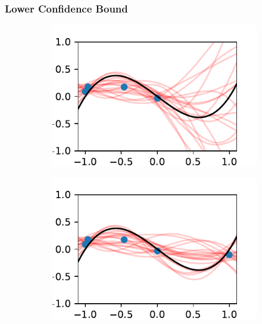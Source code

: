 \documentclass{beamer}
\begin{document}
\begin{frame}
    \frametitle{Lower Confidence Bound}
    \begin{figure}
        \centering
        \begin{subfigure}[t]{0.4\textwidth}
            \centering
            \includegraphics[width=\textwidth]{UCB_4_iters.pdf}
        \end{subfigure}%
        \begin{subfigure}[t]{0.4\textwidth}
            \centering
            \includegraphics[width=\textwidth]{UCB_5_iters.pdf}
        \end{subfigure}
        \begin{subfigure}[t]{0.4\textwidth}
            \centering

\end{subfigure}
\end{figure}
\end{frame}
\end{document}
